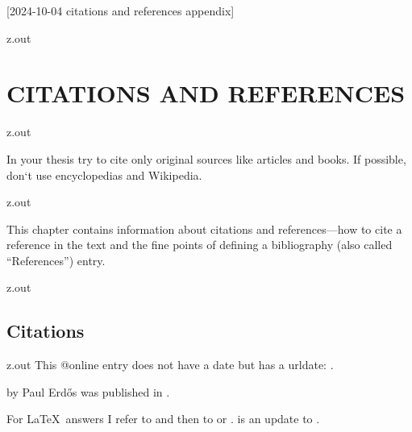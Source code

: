 [2024-10-04 citations and references appendix]

\begin{VerbatimOut}{z.out}
\chapter{CITATIONS AND REFERENCES}
\end{VerbatimOut}

\MyIO


\begin{VerbatimOut}{z.out}

In your thesis try to cite only original sources like articles
and books.
If possible,
don`t use encyclopedias and Wikipedia.
\cite{citing-wikipedia}
\end{VerbatimOut}

\MyIO


\begin{VerbatimOut}{z.out}

This chapter contains information about citations
and references---how to cite a reference in the text
and the fine points of defining a bibliography
(also called ``References'')
entry.
\end{VerbatimOut}

\MyIO


\begin{VerbatimOut}{z.out}


\section{Citations}
\end{VerbatimOut}

\MyIO


\begin{VerbatimOut}{z.out}
This @online entry does not have a date
but has a urldate:
\cite{engineering}.

by Paul Erd\H os
\cite{erdos1992}
was published in
\citeyear{erdos1992}.

For \LaTeX\ answers I refer to
\cite{lamport1994}
and then to
\cite{goossens1994}
or
\cite{kopka1999}.
\cite{kopka1999}
is an update to
\cite{kopka1995}.
\end{VerbatimOut}

\MyIO


